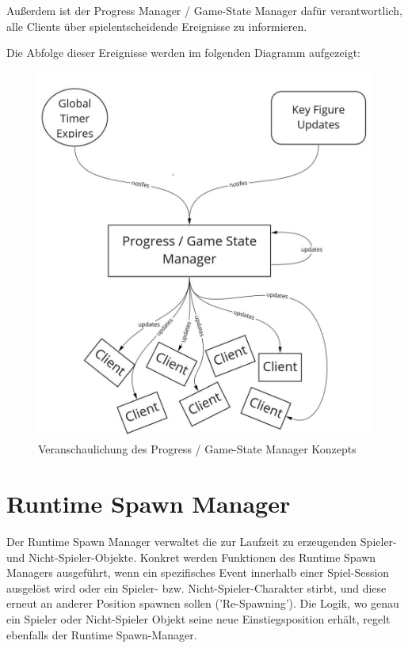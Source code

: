 Außerdem ist der Progress Manager / Game-State Manager dafür verantwortlich, alle Clients über spielentscheidende Ereignisse zu informieren. 

Die Abfolge dieser Ereignisse werden im folgenden Diagramm aufgezeigt:

\begin{figure}[H]
	\centering
	\includegraphics[width=150mm]{images/Progress_State_Manager.jpg}
	\caption[Progress / Game-State Manager]{Veranschaulichung des Progress / Game-State Manager Konzepts}
	\label{pic:Progress_State_Manager}
\end{figure}

\section{Runtime Spawn Manager}
\label{spawn_manager}

Der Runtime Spawn Manager verwaltet die zur Laufzeit zu erzeugenden Spieler- und Nicht-Spieler-Objekte. Konkret werden Funktionen des Runtime Spawn Managers ausgeführt, wenn ein spezifisches Event innerhalb einer Spiel-Session ausgelöst wird oder ein Spieler- bzw. Nicht-Spieler-Charakter stirbt, und diese erneut an anderer Position spawnen sollen ('Re-Spawning'). Die Logik, wo genau ein Spieler oder Nicht-Spieler Objekt seine neue Einstiegsposition erhält, regelt ebenfalls der Runtime Spawn-Manager.

